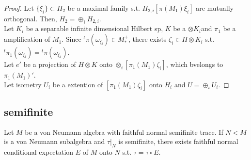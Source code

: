 \begin{proof}
  Let $\{\xi_i\} \subset H_2$ be a maximal family s.t. $H_{2,i}[\pi(M_1)\xi_i]$ are mutually orthogonal.
  Then, $H_2 = \oplus_i H_{2,i}$.\\
  Let $K_i$ be a separable infinite dimensional Hilbert sp, $K$ be a $\otimes K_i$and $\pi_1$ be a amplification of $M_1$.
  Since ${}^t\pi(\omega_{\xi_i}) \in M_*^+$, there exists $\zeta_i \in H \otimes K_i$ s.t. ${}^t\pi_1(\omega_{\zeta_i})={}^t\pi(\omega_{\xi_i})$.\\
  Let $e'$ be a projection of $H\otimes K$ onto $\otimes_i [\pi_1(M_1)\zeta_i]$, which bvelongs to ${\pi_1(M_1)}'$.\\
  Let isometry $U_i$ be a extention of $[\pi_1(M_1)\zeta_i]$ onto $H_i$ and $U = \oplus_i U_i$.
\end{proof}

\subsection{semifinite}
\begin{proposition}
  Let $M$ be a von Neumann algebra with faithful normal semifinite trace. If $N < M$ is a von Neumann subalgebra and $\tau|_N$ is semifinite, there exists faithful normal conditional expectation $E$ of $M$ onto $N$ s.t. $\tau = \tau \circ E$.
\end{proposition}

